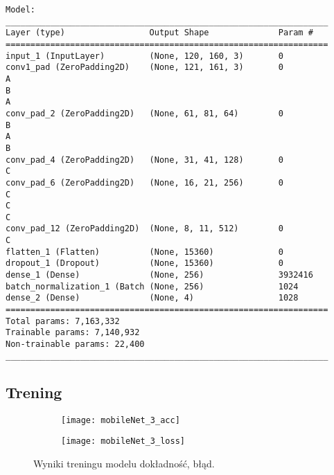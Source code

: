 \begin{verbatim}
Model: 
_________________________________________________________________
Layer (type)                 Output Shape              Param #   
=================================================================
input_1 (InputLayer)         (None, 120, 160, 3)       0         
conv1_pad (ZeroPadding2D)    (None, 121, 161, 3)       0         
A           
B   
A        
conv_pad_2 (ZeroPadding2D)   (None, 61, 81, 64)        0         
B     
A     
B      
conv_pad_4 (ZeroPadding2D)   (None, 31, 41, 128)       0         
C
conv_pad_6 (ZeroPadding2D)   (None, 16, 21, 256)       0         
C  
C
C
conv_pad_12 (ZeroPadding2D)  (None, 8, 11, 512)        0         
C
flatten_1 (Flatten)          (None, 15360)             0        
dropout_1 (Dropout)          (None, 15360)             0         
dense_1 (Dense)              (None, 256)               3932416   
batch_normalization_1 (Batch (None, 256)               1024      
dense_2 (Dense)              (None, 4)                 1028      
=================================================================
Total params: 7,163,332
Trainable params: 7,140,932
Non-trainable params: 22,400
_________________________________________________________________
\end{verbatim}

\subsection{Trening}

\begin{figure}[h]
	\centering
	\begin{subfigure}{0.4\textwidth}
		\centering
		\texttt{[image: mobileNet\_3\_acc]}
		\subcaption{\label{subfigure_a}}
	\end{subfigure}
	\begin{subfigure}{0.4\textwidth}
		\centering
		\texttt{[image: mobileNet\_3\_loss]}
		\subcaption{\label{subfigure_b}}
	\end{subfigure}
	
	\caption{\label{fig:subcaption_example}Wyniki treningu modelu \protect{} dokładność, \protect{} błąd.}
\end{figure}

